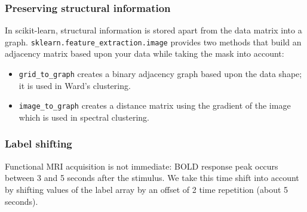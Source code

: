 \documentclass{frontiersSCNS} %
\newcommand{\alex}[1]{\todo[inline, color=green!40]{#1}}
\newcounter{x}
\newcounter{y}
\newcounter{z}
\begin{document}



\subsubsection{Preserving structural information}

In scikit-learn, structural information is stored apart from the data matrix
into a graph. \verb!sklearn.feature_extraction.image! provides two methods
that build an adjacency matrix based upon your data while taking the mask
into account:
\begin{itemize}
    \item \verb!grid_to_graph! creates a binary adjacency graph based upon the
        data shape; it is used in Ward's clustering.
    \item \verb!image_to_graph! creates a distance matrix using the gradient of
        the image which is used in spectral clustering.
\end{itemize}

\subsubsection{Label shifting}

Functional MRI acquisition is not immediate: BOLD response peak occurs between 3
and 5 seconds after the stimulus. We take this time shift into account by
shifting values of the label array by an offset of 2 time repetition (about 5
seconds).


\end{document}

